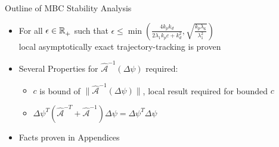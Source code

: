 \begin{frame}[t]{Outline of MBC Stability Analysis}
\pause

\begin{itemize}
\item For all $\epsilon\in\mathbb{R}^{}_+$ such that
  $\epsilon\leq\min\left(\frac{4 k_p k_d}{2 \lambda_1 k_p c
      +k_d^2},\sqrt{\frac{k_p \lambda_6}{\lambda_1^{2}}} \right)$
  \\local asymptotically exact trajectory-tracking is proven
\item Several Properties for $\hat{\mathcal{A}}^{-1}(\Delta \psi)$
  required:
\begin{itemize}
\item $c$ is bound of $\|\hat{\mathcal{A}}^{-1}(\Delta \psi)\|$, local
  result required for bounded $c$
\item $\Delta\psi^T\left(\hat{\mathcal{A}}^{-T}+\hat{\mathcal{A}}^{-1}\right)\Delta
\psi=\Delta\psi^T\Delta\psi$
\end{itemize}
\item Facts proven in Appendices
\end{itemize}
\end{frame}


